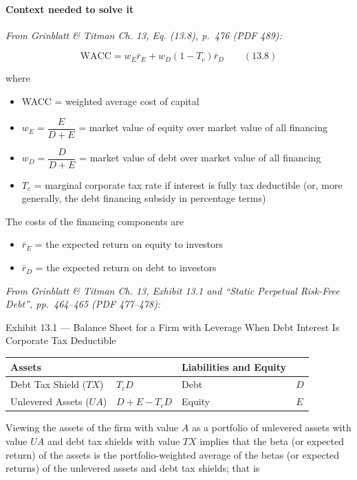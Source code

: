 \documentclass[11pt,a4paper]{article}
\numberwithin{equation}{section}
\providecommand{\tightlist}{\setlength{\itemsep}{0pt}\setlength{\parskip}{0pt}}
\begin{document}
\paragraph{Context needed to solve it}

\emph{From Grinblatt \& Titman Ch. 13, Eq. (13.8), p.~476 (PDF 489):}

\[\text{WACC} = w_E \bar r_E + w_D (1 - T_c) \bar r_D \qquad (13.8)\]

where

\begin{itemize}
\tightlist
\item
  WACC = weighted average cost of capital
\item
  \(w_E = \dfrac{E}{D + E}\) = market value of equity over market value of all financing
\item
  \(w_D = \dfrac{D}{D + E}\) = market value of debt over market value of all financing
\item
  \(T_c\) = marginal corporate tax rate if interest is fully tax deductible (or, more generally, the
  debt financing subsidy in percentage terms)
\end{itemize}

The costs of the financing components are

\begin{itemize}
\tightlist
\item
  \(\bar r_E\) = the expected return on equity to investors
\item
  \(\bar r_D\) = the expected return on debt to investors
\end{itemize}

\emph{From Grinblatt \& Titman Ch. 13, Exhibit 13.1 and ``Static Perpetual Risk-Free Debt'',
pp.~464--465 (PDF 477--478):}

Exhibit 13.1 --- Balance Sheet for a Firm with Leverage When Debt Interest Is Corporate Tax
Deductible

{\def\LTcaptype{none} %
\begin{longtable}[]{@{}llll@{}}
\toprule\noalign{}
Assets & & Liabilities and Equity & \\
\midrule\noalign{}
\endhead
\bottomrule\noalign{}
\endlastfoot
Debt Tax Shield (\(TX\)) & \(T_c D\) & Debt & \(D\) \\
Unlevered Assets (\(UA\)) & \(D + E - T_c D\) & Equity & \(E\) \\
\end{longtable}
}

Viewing the assets of the firm with value \(A\) as a portfolio of unlevered assets with value \(UA\)
and debt tax shields with value \(TX\) implies that the beta (or expected return) of the assets is
the portfolio-weighted average of the betas (or expected returns) of the unlevered assets and debt
tax shields; that is
\end{document}
